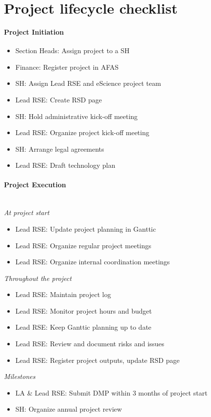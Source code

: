 \section{Project lifecycle checklist}
\label{app:checklist}

\paragraph{Project Initiation}
\begin{itemize}
    \item[$\square$] Section Heads: Assign project to a SH 
    \item[$\square$] Finance: Register project in AFAS
    \item[$\square$] SH: Assign Lead RSE and eScience project team
    \item[$\square$] Lead RSE: Create RSD page
    \item[$\square$] SH: Hold administrative kick-off meeting
    \item[$\square$] Lead RSE: Organize project kick-off meeting
    \item[$\square$] SH: Arrange legal agreements
    \item[$\square$] Lead RSE: Draft technology plan
\end{itemize}

\paragraph{Project Execution}\mbox{}\\[0.6em]
\textit{At project start}
\begin{itemize}
    \item[$\square$] Lead RSE: Update project planning in Ganttic
    \item[$\square$] Lead RSE: Organize regular project meetings
    \item[$\square$] Lead RSE: Organize internal coordination meetings
\end{itemize}
\textit{Throughout the project}
\begin{itemize}
    \item[$\square$] Lead RSE: Maintain project log
    \item[$\square$] Lead RSE: Monitor project hours and budget
    \item[$\square$] Lead RSE: Keep Ganttic planning up to date
    \item[$\square$] Lead RSE: Review and document risks and issues
    \item[$\square$] Lead RSE: Register project outputs, update RSD page
\end{itemize}
\textit{Milestones}
\begin{itemize}
    \item[$\square$] LA \& Lead RSE: Submit DMP within 3 months of project start
    \item[$\square$] SH: Organize annual project review
\end{itemize}

